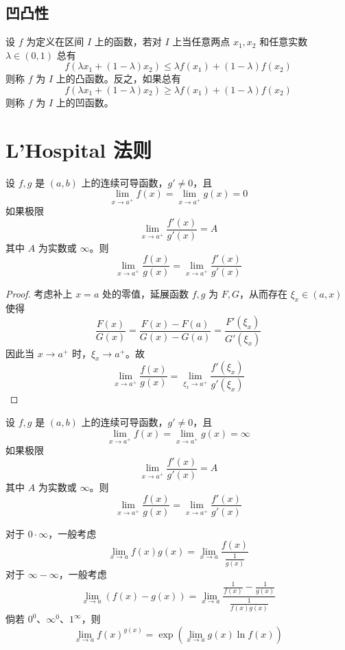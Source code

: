 \subsection{凹凸性}

\begin{definition}
	设 $f$ 为定义在区间 $I$ 上的函数，若对 $I$ 上当任意两点 $x_1,x_2$ 和任意实数 $\lambda\in (0,1)$ 总有
	\[ f(\lambda x_1+(1-\lambda)x_2) \leqslant \lambda f(x_1)+(1-\lambda)f(x_2) \]
	则称 $f$ 为 $I$ 上的凸函数。反之，如果总有
	\[ f(\lambda x_1+(1-\lambda)x_2) \geqslant \lambda f(x_1)+(1-\lambda)f(x_2) \]
	则称 $f$ 为 $I$ 上的凹函数。
\end{definition}

\section{L'Hospital 法则}

\begin{theorem}[L'Hospital 法则，0/0 型]
	设 $f,g$ 是 $(a,b)$ 上的连续可导函数，$g' \neq 0$，且
	\[ \lim_{x \to a^{+}} f(x) = \lim_{x \to a^{+}} g(x) = 0 \]
	如果极限
	\[ \lim_{x \to a^{+}} \frac{f'(x)}{g'(x)} = A \]
	其中 $A$ 为实数或 $\infty$。则
	\[ \lim_{x \to a^{+}} \frac{f(x)}{g(x)} = \lim_{x \to a^{+}} \frac{f'(x)}{g'(x)} \]
\end{theorem}

\begin{proof}
	考虑补上 $x=a$ 处的零值，延展函数 $f, g$ 为 $F, G$，从而存在 $\xi_x \in (a, x)$ 使得
	\[ \frac{F(x)}{G(x)} = \frac{F(x) - F(a)}{G(x) - G(a)} = \frac{F'(\xi_x)}{G'(\xi_x)} \]
	因此当 $x \to a^+$ 时，$\xi_x \to a^+$。故
	\[ \lim_{x \to a^{+}} \frac{f(x)}{g(x)} = \lim_{\xi_x \to a^{+}} \frac{f'(\xi_x)}{g'(\xi_x)} \]
\end{proof}

\begin{theorem}[L'Hospital 法则，0/0 型]
	设 $f,g$ 是 $(a,b)$ 上的连续可导函数，$g' \neq 0$，且
	\[ \lim_{x \to a^{+}} f(x) = \lim_{x \to a^{+}} g(x) = \infty \]
	如果极限
	\[ \lim_{x \to a^{+}} \frac{f'(x)}{g'(x)} = A \]
	其中 $A$ 为实数或 $\infty$。则
	\[ \lim_{x \to a^{+}} \frac{f(x)}{g(x)} = \lim_{x \to a^{+}} \frac{f'(x)}{g'(x)} \]
\end{theorem}

对于 $0 \cdot \infty$，一般考虑
\[ \lim_{x \to a} f(x) g(x) = \lim_{x \to a} \frac{f(x)}{\frac{1}{g(x)}} \]
对于 $\infty - \infty$，一般考虑
\[ \lim_{x \to a} (f(x) - g(x)) = \lim_{x \to a} \frac{\frac{1}{f(x)} - \frac{1}{g(x)}}{\frac{1}{f(x)g(x)}} \]
倘若 $0^0$、$\infty^0$、$1^\infty$，则
\[ \lim_{x \to a} f(x)^{g(x)} = \exp \left(\lim_{x \to a} g(x) \ln f(x) \right) \]

